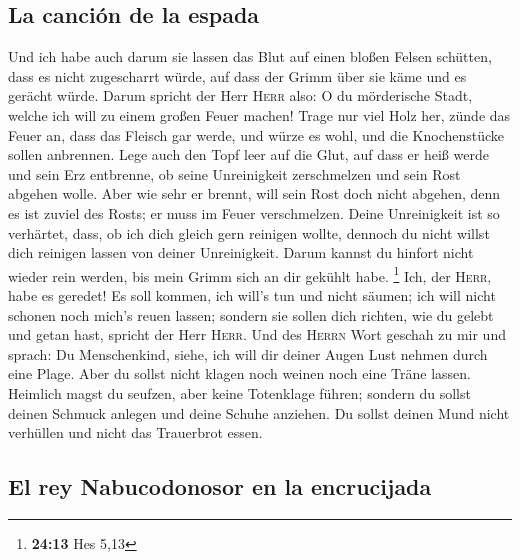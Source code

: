 \hypertarget{la-canciuxf3n-de-la-espada}{%
\subsection{La canción de la espada}\label{la-canciuxf3n-de-la-espada}}

 Und ich habe auch darum sie lassen das Blut auf einen
bloßen Felsen schütten, dass es nicht zugescharrt würde, auf dass der
Grimm über sie käme und es gerächt würde.  Darum spricht
der Herr \textsc{Herr} also: O du mörderische Stadt, welche ich will zu
einem großen Feuer machen!  Trage nur viel Holz her,
zünde das Feuer an, dass das Fleisch gar werde, und würze es wohl, und
die Knochenstücke sollen anbrennen.  Lege auch den Topf
leer auf die Glut, auf dass er heiß werde und sein Erz entbrenne, ob
seine Unreinigkeit zerschmelzen und sein Rost abgehen wolle.
 Aber wie sehr er brennt, will sein Rost doch nicht
abgehen, denn es ist zuviel des Rosts; er muss im Feuer verschmelzen.
 Deine Unreinigkeit ist so verhärtet, dass, ob ich dich
gleich gern reinigen wollte, dennoch du nicht willst dich reinigen
lassen von deiner Unreinigkeit. Darum kannst du hinfort nicht wieder
rein werden, bis mein Grimm sich an dir gekühlt habe. \footnote{\textbf{24:13}
  Hes 5,13}  Ich, der \textsc{Herr}, habe es geredet! Es
soll kommen, ich will's tun und nicht säumen; ich will nicht schonen
noch mich's reuen lassen; sondern sie sollen dich richten, wie du gelebt
und getan hast, spricht der Herr \textsc{Herr}.  Und des
\textsc{Herrn} Wort geschah zu mir und sprach:  Du
Menschenkind, siehe, ich will dir deiner Augen Lust nehmen durch eine
Plage. Aber du sollst nicht klagen noch weinen noch eine Träne lassen.
 Heimlich magst du seufzen, aber keine Totenklage führen;
sondern du sollst deinen Schmuck anlegen und deine Schuhe anziehen. Du
sollst deinen Mund nicht verhüllen und nicht das Trauerbrot essen.

\hypertarget{el-rey-nabucodonosor-en-la-encrucijada}{%
\subsection{El rey Nabucodonosor en la
encrucijada}\label{el-rey-nabucodonosor-en-la-encrucijada}}

